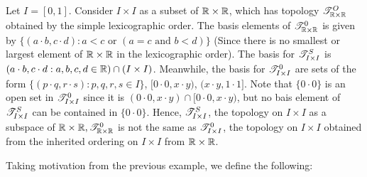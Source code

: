 \documentclass[main.tex]{subfiles}
\begin{document}
    \begin{example}
        Let $I=[0,1]$. Consider $I \times I$ as a subset of $\mathbb R\times \mathbb R$, which has topology $\mathscr T^O_{\mathbb R \times \mathbb R}$ obtained by the simple lexicographic order. The basis elements of $\mathscr T^0_{\mathbb R \times \mathbb R}$ is given by $\{(a\cdot b, c \cdot d): a<c \text{ or } (a=c \text{ and }b<d )\}$ (Since there is no smallest or largest element of $\mathbb R \times \mathbb R$ in the lexicographic order). The basis for $\mathscr T^S_{I \times I}$ is $(a\cdot b, c\cdot d: a,b,c,d \in \mathbb R ) \cap (I \times I)$. Meanwhile, the basis for $\mathscr T^0_{I \times I}$ are sets of the form $\{(p\cdot q, r\cdot s):p,q,r,s \in I\}$, $[0\cdot 0, x \cdot y)$, $(x\cdot y, 1\cdot 1]$. Note that $\{0 \cdot 0\}$ is an open set in $\mathscr T^0_{I \times I}$ since it is $(0\cdot0, x \cdot y) \cap [0\cdot 0, x \cdot y)$, but no bais element of $\mathscr T^S_{I \times I}$ can be contained in $\{0 \cdot 0 \}$. Hence, $\mathscr T^S_{I \times I}$, the topology on $I \times I$ as a subspace of $\mathbb R\times\mathbb R, \mathscr T^0_{\mathbb R \times \mathbb R}$ is not the same as $\mathscr T^0_{I \times I}$, the topology on $I \times I$ obtained from the inherited ordering on $I \times I$ from $\mathbb R\times\mathbb R$.
\end{example}
Taking motivation from the previous example, we define the following:
\end{document}
